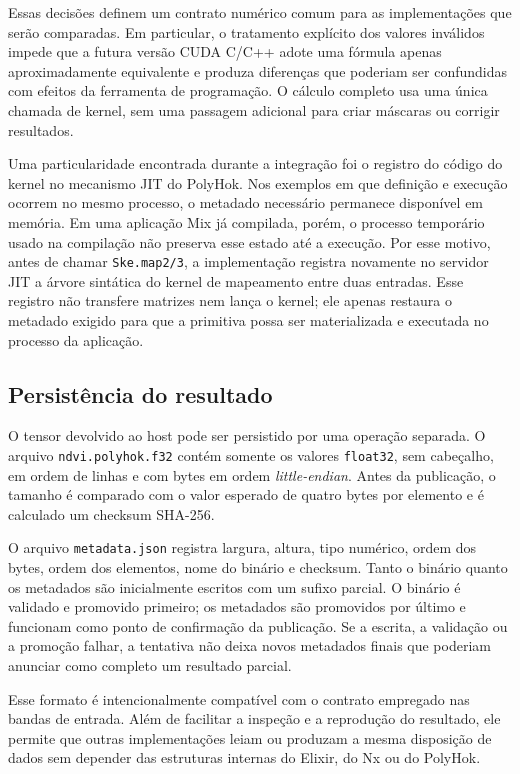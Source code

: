 \documentclass[tcc,capa]{texufpel}
\begin{document}
Essas decisões definem um contrato numérico comum para as implementações que serão
comparadas. Em particular, o tratamento explícito dos valores inválidos impede que
a futura versão CUDA C/C++ adote uma fórmula apenas aproximadamente equivalente e
produza diferenças que poderiam ser confundidas com efeitos da ferramenta de
programação. O cálculo completo usa uma única chamada de kernel, sem uma passagem
adicional para criar máscaras ou corrigir resultados.

Uma particularidade encontrada durante a integração foi o registro do código do
kernel no mecanismo JIT do PolyHok. Nos exemplos em que definição e execução
ocorrem no mesmo processo, o metadado necessário permanece disponível em memória.
Em uma aplicação Mix já compilada, porém, o processo temporário usado na compilação
não preserva esse estado até a execução. Por esse motivo, antes de chamar
\texttt{Ske.map2/3}, a implementação registra novamente no servidor JIT a árvore
sintática do kernel de mapeamento entre duas entradas. Esse registro não transfere
matrizes nem lança o kernel; ele apenas restaura o metadado exigido para que a
primitiva possa ser materializada e executada no processo da aplicação.

\subsection{Persistência do resultado}

O tensor devolvido ao host pode ser persistido por uma operação separada. O arquivo
\texttt{ndvi.polyhok.f32} contém somente os valores \texttt{float32}, sem
cabeçalho, em ordem de linhas e com bytes em ordem \textit{little-endian}. Antes da
publicação, o tamanho é comparado com o valor esperado de quatro bytes por elemento
e é calculado um checksum SHA-256.

O arquivo \texttt{metadata.json} registra largura, altura, tipo numérico, ordem dos
bytes, ordem dos elementos, nome do binário e checksum. Tanto o binário quanto os
metadados são inicialmente escritos com um sufixo parcial. O binário é validado e
promovido primeiro; os metadados são promovidos por último e funcionam como ponto
de confirmação da publicação. Se a escrita, a validação ou a promoção falhar, a
tentativa não deixa novos metadados finais que poderiam anunciar como completo um
resultado parcial.

Esse formato é intencionalmente compatível com o contrato empregado nas bandas de
entrada. Além de facilitar a inspeção e a reprodução do resultado, ele permite que
outras implementações leiam ou produzam a mesma disposição de dados sem depender
das estruturas internas do Elixir, do Nx ou do PolyHok.
\end{document}
